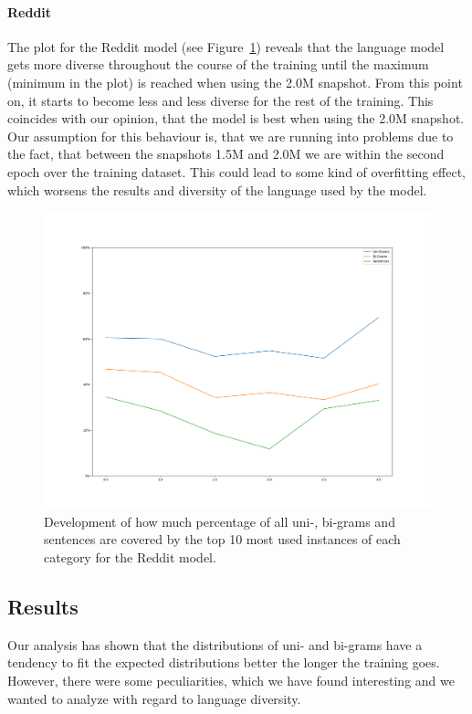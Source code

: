 \paragraph{Reddit} The plot for the Reddit model (see Figure~\ref{results:language_model:diversity:reddit}) reveals that the language model gets more diverse throughout the course of the training until the maximum (minimum in the plot) is reached when using the 2.0M snapshot. From this point on, it starts to become less and less diverse for the rest of the training. This coincides with our opinion, that the model is best when using the 2.0M snapshot. Our assumption for this behaviour is, that we are running into problems due to the fact, that between the snapshots 1.5M and 2.0M we are within the second epoch over the training dataset. This could lead to some kind of overfitting effect, which worsens the results and diversity of the language used by the model.

\begin{figure}[H]
	\includegraphics[width=\linewidth]{img/plots/reddit/diversity_perc_plot.png}
	\caption{Development of how much percentage of all uni-, bi-grams and sentences are covered by the top 10 most used instances of each category for the Reddit model.}
	\label{results:language_model:diversity:reddit}
\end{figure}

\subsection{Results}
Our analysis has shown that the distributions of uni- and bi-grams have a tendency to fit the expected distributions better the longer the training goes. However, there were some peculiarities, which we have found interesting and we wanted to analyze with regard to language diversity.

